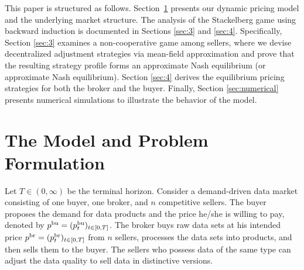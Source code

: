 \documentclass[11pt]{article}
\numberwithin{equation}{section}
\begin{document}
        
This paper is structured as follows. Section~\ref{sec:model} presents our dynamic pricing model and the underlying market structure. The analysis of the Stackelberg game using backward induction is documented in Sections \ref{sec:3} and \ref{sec:4}. Specifically, Section \ref{sec:3} examines a non-cooperative game among sellers, where we devise decentralized adjustment strategies via mean-field approximation and prove that the resulting strategy profile forms an approximate Nash equilibrium (or approximate Nash equilibrium). Section \ref{sec:4} derives the equilibrium pricing strategies for both the broker and the buyer. Finally, Section \ref{sec:numerical} presents numerical simulations to illustrate the behavior of the model.
	
\section{The Model and Problem Formulation}\label{sec:model}
    
Let $T\in(0,\infty)$ be the terminal horizon. Consider a demand-driven data market consisting of one buyer, one broker, and $n$ competitive sellers. The buyer proposes the demand for data products and the price he/she is willing to pay, denoted by $p^{\rm bu}=(p_t^{\rm bu})_{t\in[0,T]}$. The broker buys raw data sets at his intended price $p^{\rm br}=(p_t^{\rm br})_{t\in[0,T]}$ from $n$ sellers, processes the data sets into products, and then sells them to the buyer. The sellers who possess data of the same type can adjust the data quality to sell data in distinctive versions.
	
\end{document}
